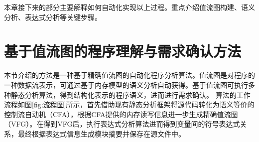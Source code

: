 %

本章接下来的部分主要解释如何自动化实现以上过程。重点介绍值流图构建、语义分析、表达式分析等关键步骤。

\section{基于值流图的程序理解与需求确认方法}
\label{sec:值流图程序理解方法}

本节介绍的方法是一种基于精确值流图的自动化程序分析算法。值流图是对程序的一种数据流表示，可通过基于内存模型的语义分析自动获得。基于值流图可执行多种静态分析算法，得到结构化表示的程序语义，进而进行需求确认。
算法的工作流程如图\ref{fig:流程图}所示，首先借助现有静态分析框架将源代码转化为语义等价的控制流自动机（CFA），根据CFA提供的内存读写信息进一步生成精确值流图（VFG）。在得到VFG后，执行表达式分析算法进而得到变量间的符号表达式关系，最终根据表达式信息生成模块摘要并保存在源文件中。

